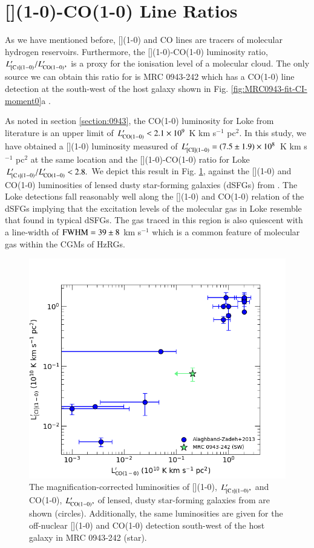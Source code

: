 \section{[](1-0)-CO(1-0) Line Ratios}
As we have mentioned before, [](1-0) and CO lines are tracers of molecular hydrogen reservoirs. Furthermore, the [](1-0)-CO(1-0) luminosity ratio, $L'_{\rm [\ion{C}{i}](1-0)}/L'_{\rm CO(1-0)},$ is a proxy for the ionisation level of a molecular cloud. The only source we can obtain this ratio for is MRC 0943-242 which has a CO(1-0) line detection at the south-west of the host galaxy shown in Fig. \ref{fig:MRC0943-fit-CI-moment0}a \citep[region named Loke;][]{Gullberg2016a}. 

As noted in section \ref{section:0943}, the CO(1-0) luminosity for Loke from literature is an upper limit of $L'_{\rm CO(1-0)} < 2.1 \times 10^{9}$ K km s$^{-1}$ pc$^2.$ In this study, we have obtained a [](1-0) luminosity measured of $L'_{[\rm CI](1-0)} = (7.5\pm1.9)\times 10^{8}$ K km s$^{-1}$ pc$^2$ at the same location and the [](1-0)-CO(1-0) ratio for Loke $L'_{\rm [\ion{C}{i}](1-0)}/L'_{\rm CO(1-0)} < 2.8.$ We depict this result in Fig. \ref{fig:CO-CI-plot}, against the [](1-0) and CO(1-0) luminosities of lensed dusty star-forming galaxies (dSFGs) from \citet{Alaghband-Zadeh2013}. The Loke detections fall reasonably well along the [](1-0) and CO(1-0) relation of the dSFGs implying that the excitation levels of the molecular gas in Loke resemble that found in typical dSFGs. The gas traced in this region is also quiescent with a line-width of $\rm FWHM = 39\pm8$ km s$^{-1}$ which is a common feature of molecular gas within the CGMs of HzRGs. 

\begin{figure}
  \centering
  \includegraphics[width=0.8\columnwidth]{plots_chp4/CO_CI_HzRGs_AZ.png}
  \caption[$L'_{\rm [\ion{C}{i}](1-0)}$ vs $L'_{\rm CO(1-0)}$ of lensed dSFGs and HzRGs]{The magnification-corrected luminosities of [](1-0), $L'_{\rm [\ion{C}{i}](1-0)},$ and CO(1-0), $L'_{\rm CO(1-0)},$ of lensed, dusty star-forming galaxies from \citet{Alaghband-Zadeh2013} are shown (circles). Additionally, the same luminosities are given for the off-nuclear [](1-0) and CO(1-0) detection south-west of the host galaxy in MRC 0943-242 (star).}
  \label{fig:CO-CI-plot}
\end{figure}

